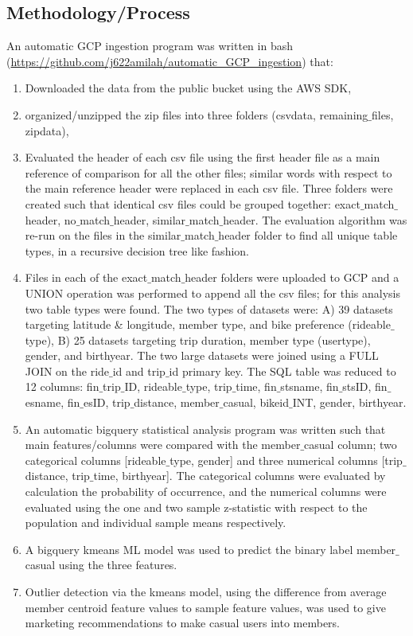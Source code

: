 \documentclass[11pt, onecolumn]{article}
\begin{document}
\subsection{Methodology/Process}
An automatic GCP ingestion program was written in bash (\url{https://github.com/j622amilah/automatic_GCP_ingestion}) that: 
\begin{enumerate}
\item Downloaded the data from the public bucket using the AWS SDK,
\item organized/unzipped the zip files into three folders (csvdata, remaining$\_$files, zipdata),
\item Evaluated the header of each csv file using the first header file as a main reference of comparison for all the other files; similar words with respect to the main reference header were replaced in each csv file. Three folders were created such that identical csv files could be grouped together: exact$\_$match$\_$header, no$\_$match$\_$header, similar$\_$match$\_$header. The evaluation algorithm was re-run on the files in the similar$\_$match$\_$header folder to find all unique table types, in a recursive decision tree like fashion.
\item Files in each of the exact$\_$match$\_$header folders were uploaded to GCP and a UNION operation was performed to append all the csv files; for this analysis two table types were found. The two types of datasets were: A) 39 datasets targeting latitude \& longitude, member type, and bike preference (rideable$\_$type), B) 25 datasets targeting trip duration, member type (usertype), gender, and birthyear. The two large datasets were joined using a FULL JOIN on the ride$\_$id and trip$\_$id primary key. The SQL table was reduced to 12 columns: fin$\_$trip$\_$ID, rideable$\_$type, trip$\_$time, fin$\_$stsname, fin$\_$stsID, fin$\_$esname, fin$\_$esID, trip$\_$distance, member$\_$casual, bikeid$\_$INT, gender, birthyear. 
\item An automatic bigquery statistical analysis program was written such that main features/columns were compared with the member$\_$casual column; two categorical columns [rideable$\_$type, gender] and three numerical columns [trip$\_$distance, trip$\_$time, birthyear]. The categorical columns were evaluated by calculation the probability of occurrence, and the numerical columns were evaluated using the one and two sample z-statistic with respect to the population and individual sample means respectively.
\item A bigquery kmeans ML model was used to predict the binary label member$\_$casual using the three features.
\item  Outlier detection via the kmeans model, using the difference from average member centroid feature values to sample feature values, was used to give marketing recommendations to make casual users into members. 
\end{enumerate}
\end{document}
